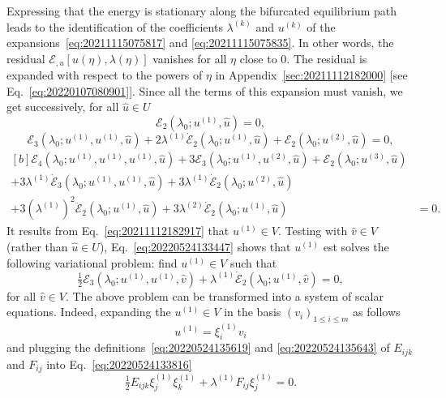 \documentclass[12pt, final]{scrartcl}
\theoremstyle{definition}
\newcommand{\E}{\mathcal E}
\newcommand{\order}[2][1]{#2^{(#1)}}
\begin{document}
Expressing that the energy is stationary along the bifurcated equilibrium path leads to the identification of the
coefficients $\order[k]\lambda$ and $\order[k]u$ of the expansions~\eqref{eq:20211115075817} and
\eqref{eq:20211115075835}. In other words, the residual $\E_{, u} [u(\eta), \lambda(\eta)]$ vanishes for all $\eta$
close to $0$. The residual is expanded with respect to the powers of $\eta$ in Appendix~\ref{sec:20211112182000} [see
Eq.~\eqref{eq:20220107080901}]. Since all the terms of this expansion must vanish, we get successively, for all
$\hat{u} \in U$
\begin{equation}
  \label{eq:20211112182917}
  \E_2(\lambda_0; \order[1]u, \hat{u}) = 0,
\end{equation}
\begin{equation}
  \label{eq:20220524133447}
  \E_3(\lambda_0; \order[1]u, \order[1]u, \hat{u}) + 2\order[1]\lambda\dot{\E}_2(\lambda_0; \order[1]u, \hat{u}) + \E_2(\lambda_0; \order[2]u, \hat{u}) = 0,
\end{equation}
\begin{equation}
  \label{eq:20220708060436}
  \begin{aligned}[b]
    \E_4(\lambda_0; \order[1]u, \order[1]u, \order[1]u, \hat{u}) + 3\E_3(\lambda_0; \order[1]u, \order[2]u, \hat{u}) + \E_2(\lambda_0; \order[3]u, \hat{u})&\\
    + 3\order[1]\lambda\dot{\E}_3(\lambda_0; \order[1]u, \order[1]u, \hat{u}) + 3\order[1]\lambda\dot{\E}_2(\lambda_0;  \order[2]u, \hat{u})&\\
    + 3(\order[1]\lambda)^2\ddot{\E}_2(\lambda_0; \order[1]u, \hat{u}) + 3\order[2]\lambda\dot{\E}_2(\lambda_0; \order[1]u, \hat{u}) & = 0.
  \end{aligned}
\end{equation}
It results from Eq.~\eqref{eq:20211112182917} that $\order[1]u \in V$. Testing with $\hat{v} \in V$ (rather than
$\hat{u} \in U$), Eq.~\eqref{eq:20220524133447} shows that $\order[1]u$ est solves the following variational problem:
find $\order[1]u \in V$ such that
\begin{equation}
  \label{eq:20220524133816}
  \tfrac{1}{2} \E_3(\lambda_0; \order[1]u, \order[1]u, \hat{v}) + \order[1]\lambda\dot{\E}_2(\lambda_0; \order[1]u, \hat{v}) = 0,
\end{equation}
for all $\hat{v} \in V$. The above problem can be transformed into a system of scalar equations. Indeed, expanding the
$\order[1]u \in V$ in the basis $(v_i)_{1 \leq i \leq m}$ as follows
\begin{equation}
  \label{eq:20220524133944}
  \order[1]u = \order[1]{\xi_i} v_i
\end{equation}
and plugging the definitions~\eqref{eq:20220524135619} and
\eqref{eq:20220524135643} of $E_{ijk}$ and $F_{ij}$ into
Eq.~\eqref{eq:20220524133816}
\begin{equation}
  \label{eq:20220524135036}
  \tfrac{1}{2} E_{ijk} \order[1]{\xi_j} \order[1]{\xi_k} + \order[1]\lambda F_{ij} \order[1]{\xi_j} = 0.
\end{equation}
\end{document}
